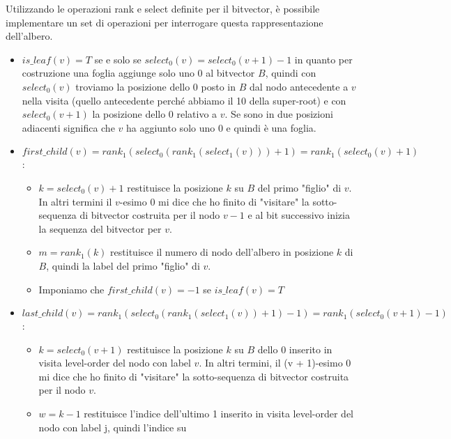 Utilizzando le operazioni rank e select definite per il bitvector, è possibile
implementare un set di operazioni per interrogare questa rappresentazione
dell'albero.
\begin{itemize}
    \item $is\_leaf(v) = T$ se e solo se $select_0(v) = select_0(v + 1) - 1$ in
          quanto per costruzione una foglia aggiunge solo uno 0 al bitvector $B$,
          quindi con $select_0(v)$ troviamo la posizione dello 0 posto in $B$ dal
          nodo antecedente a $v$ nella visita (quello antecedente perché abbiamo
          il 10 della super-root) e con $select_0(v + 1)$ la posizione dello 0
          relativo a $v$. Se sono in due posizioni adiacenti significa che $v$ ha
          aggiunto solo uno $0$ e quindi è una foglia.
    \item $first\_child(v) = rank_1(select_0(rank_1(select_1(v)))+1) = rank_1
              (select_0(v)+1)$:
          \begin{itemize}
              \item $k = select_0(v) + 1$ restituisce la posizione $k$ su $B$ del
                    primo "figlio" di $v$. In altri termini il $v$-esimo 0 mi
                    dice che ho finito di "visitare" la sotto-sequenza di bitvector
                    costruita per il nodo $v - 1$ e al bit successivo inizia la
                    sequenza del bitvector per $v$.
              \item $m = rank_1(k)$ restituisce il numero di nodo dell'albero in
                    posizione $k$ di $B$, quindi la label del primo "figlio" di
                    $v$.
              \item Imponiamo che $first\_child(v) = - 1$ se $is\_leaf (v) = T$
          \end{itemize}
    \item $last\_child(v) = rank_1(select_0(rank_1(select_1(v))+1)-1) = rank_1
              (select_0(v+1)-1)$:
          \begin{itemize}
              \item $k = select_0(v + 1)$ restituisce la posizione $k$ su $B$
                    dello $0$ inserito in visita level-order del nodo con label
                    $v$. In altri termini, il (v + 1)-esimo 0 mi dice che ho
                    finito di "visitare" la sotto-sequenza di bitvector costruita
                    per il nodo $v$.
              \item $w = k - 1$ restituisce l'indice dell'ultimo 1 inserito in
                    visita level-order del nodo con label j, quindi l'indice su

\end{itemize}
\end{itemize}

